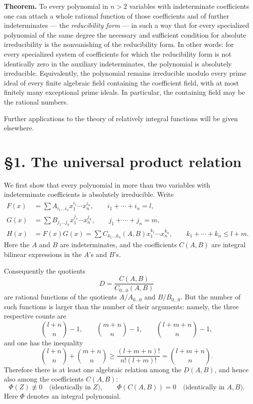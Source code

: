 \documentclass[11pt]{article}
\begin{document}
\medskip
\noindent\textbf{Theorem.}
To every polynomial in $n>2$ variables with indeterminate coefficients one can attach a whole rational function of those coefficients and of further indeterminates --- the \emph{reducibility form} --- in such a way that for every specialized polynomial of the same degree the necessary and sufficient condition for absolute irreducibility is the nonvanishing of the reducibility form. In other words: for every specialized system of coefficients for which the reducibility form is not identically zero in the auxiliary indeterminates, the polynomial is absolutely irreducible. Equivalently, the polynomial remains irreducible modulo every prime ideal of every finite algebraic field containing the coefficient field, with at most finitely many exceptional prime ideals. In particular, the containing field may be the rational numbers.

Further applications to the theory of relatively integral functions will be given elsewhere.

\section*{\S 1. The universal product relation}

We first show that every polynomial in more than two variables with indeterminate coefficients is absolutely irreducible. Write
\begin{align}
F(x) &= \sum A_{i_1\dots i_n}x_1^{i_1}\cdots x_n^{i_n}, \qquad i_1+\cdots+i_n=l, \tag{0.1}\\
G(x) &= \sum B_{j_1\dots j_n}x_1^{j_1}\cdots x_n^{j_n}, \qquad j_1+\cdots+j_n=m, \tag{0.2}\\
H(x) &= F(x)G(x)=\sum C_{k_1\dots k_n}(A,B)x_1^{k_1}\cdots x_n^{k_n},
\qquad k_1+\cdots+k_n\le l+m. \tag{0.3}
\end{align}
Here the $A$ and $B$ are indeterminates, and the coefficients $C(A,B)$ are integral bilinear expressions in the $A$'s and $B$'s.

Consequently the quotients
\[
D = \frac{C(A,B)}{C_{0\dots 0}(A,B)}
\]
are rational functions of the quotients $A/A_{0\dots 0}$ and $B/B_{0\dots 0}$. But the number of such functions is larger than the number of their arguments: namely, the three respective counts are
\[
\binom{l+n}{n}-1,\qquad \binom{m+n}{n}-1,
\qquad \binom{l+m+n}{n}-1,
\]
and one has the inequality
\[
\binom{l+n}{n}+\binom{m+n}{n}
\ge \frac{(l+m+n)!}{n!(l+m)!}
= \binom{l+m+n}{n}.
\]
Therefore there is at least one algebraic relation among the $D(A,B)$, and hence also among the coefficients $C(A,B)$:
\[
\Phi(Z)\not\equiv 0 \quad \text{(identically in $Z$)},
\qquad \Phi(C(A,B))=0 \quad \text{(identically in $A,B$)}.
\tag{0.4}
\]
Here $\Phi$ denotes an integral polynomial.
\end{document}
